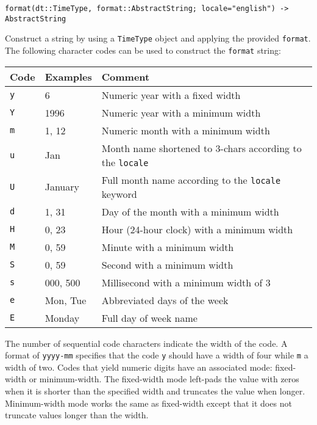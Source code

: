 \begin{adjustwidth}{2em}{0pt}


\begin{verbatim}
format(dt::TimeType, format::AbstractString; locale="english") -> AbstractString
\end{verbatim}

Construct a string by using a \texttt{TimeType} object and applying the provided \texttt{format}. The following character codes can be used to construct the \texttt{format} string:


\begin{table}[h]

\begin{tabulary}{\linewidth}{|L|L|L|}
\hline
Code & Examples & Comment \\
\hline
\texttt{y} & 6 & Numeric year with a fixed width \\
\hline
\texttt{Y} & 1996 & Numeric year with a minimum width \\
\hline
\texttt{m} & 1, 12 & Numeric month with a minimum width \\
\hline
\texttt{u} & Jan & Month name shortened to 3-chars according to the \texttt{locale} \\
\hline
\texttt{U} & January & Full month name according to the \texttt{locale} keyword \\
\hline
\texttt{d} & 1, 31 & Day of the month with a minimum width \\
\hline
\texttt{H} & 0, 23 & Hour (24-hour clock) with a minimum width \\
\hline
\texttt{M} & 0, 59 & Minute with a minimum width \\
\hline
\texttt{S} & 0, 59 & Second with a minimum width \\
\hline
\texttt{s} & 000, 500 & Millisecond with a minimum width of 3 \\
\hline
\texttt{e} & Mon, Tue & Abbreviated days of the week \\
\hline
\texttt{E} & Monday & Full day of week name \\
\hline
\end{tabulary}

\end{table}

The number of sequential code characters indicate the width of the code. A format of \texttt{yyyy-mm} specifies that the code \texttt{y} should have a width of four while \texttt{m} a width of two. Codes that yield numeric digits have an associated mode: fixed-width or minimum-width. The fixed-width mode left-pads the value with zeros when it is shorter than the specified width and truncates the value when longer. Minimum-width mode works the same as fixed-width except that it does not truncate values longer than the width.


\end{adjustwidth}

